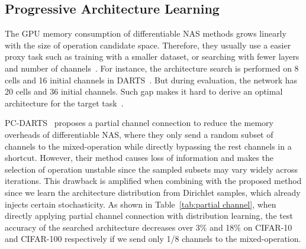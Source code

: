 \documentclass{article} \usepackage{iclr2021_conference,times}
\begin{document}
\subsection{Progressive Architecture Learning}
\label{subsec:pal}
The GPU memory consumption of differentiable NAS methods grows linearly with the size of operation candidate space. 
Therefore, they usually use a easier proxy task such as training with a smaller dataset, or searching with fewer layers and number of channels~\citep{proxylessnas}. 
For instance, the architecture search is performed on 8 cells and 16 initial channels in DARTS~\citep{darts}.
But during evaluation, the network has 20 cells and 36 initial channels.
Such gap makes it hard to derive an optimal architecture for the target task~\citep{proxylessnas}.


PC-DARTS~\citep{pcdarts} proposes a partial channel connection to reduce the memory overheads of differentiable NAS, where they only send a random subset of channels to the mixed-operation while directly bypassing the rest channels in a shortcut. However, their method causes loss of information and makes the selection of operation unstable since the sampled subsets may vary widely across iterations. 
This drawback is amplified when combining with the proposed method since we learn the architecture distribution from Dirichlet samples, which already injects certain stochasticity.
As shown in Table~\ref{tab:partial channel}, when directly applying partial channel connection with distribution learning,
the test accuracy of the searched architecture  decreases over 3\% and 18\% on CIFAR-10 and CIFAR-100 respectively if we send only 1/8 channels to the mixed-operation.
\end{document}
